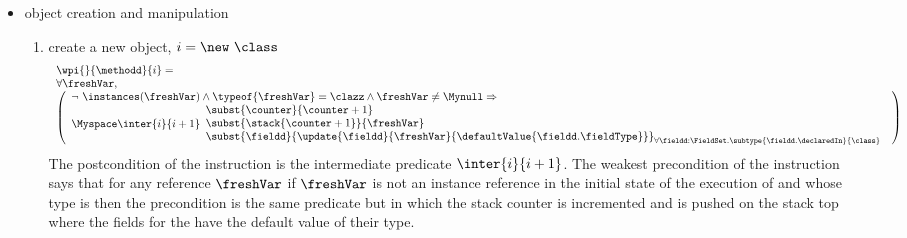 \begin{itemize}

\item  object creation and manipulation 
	\begin{enumerate}
		\item create a new object, $ i = \new  \ \class $ \\
		$$ \begin{array}{l}
                         \wpi{} {\methodd}{i}  =  \\
		 
		    \forall \freshVar,\\
                    \left(\begin{array}{l}  \neg \ \instances(\freshVar) \wedge
		     \typeof{\freshVar} = \clazz \wedge
		    \freshVar \neq \Mynull  \Rightarrow \\
		      
			                 \Myspace   %
					
                                    \inter{i}{i+1} \begin{array}{l}
		                                   \subst{ \counter}{ \counter + 1 } \\
						   \subst{ \stack{ \counter + 1} }{\freshVar} \\
						   \subst{ \fieldd} { \update{\fieldd} { \freshVar }{\defaultValue{ \fieldd.  \fieldType } } }_{{\small \forall \fieldd: \FieldSet. \subtype{\fieldd.\declaredIn}{  \class}} } \\
		       \end{array} 
                  \end{array} \right)
              \end{array}$$
		  The postcondition of the instruction \new{} is the intermediate predicate $\inter{i}{i+1}$. The weakest precondition 
		  of the instruction says that for any reference $\freshVar$ 
		  if $\freshVar$ is not an instance reference  in the initial state of the execution of \methodd{} and whose type is \class{}  then
		  the precondition is the same predicate but in which the stack
		  counter is incremented and \freshVar{}  is pushed on the stack top  where the fields for the 
		  \freshVar{} have the default value of their type. 
	

\end{enumerate}
\end{itemize}
